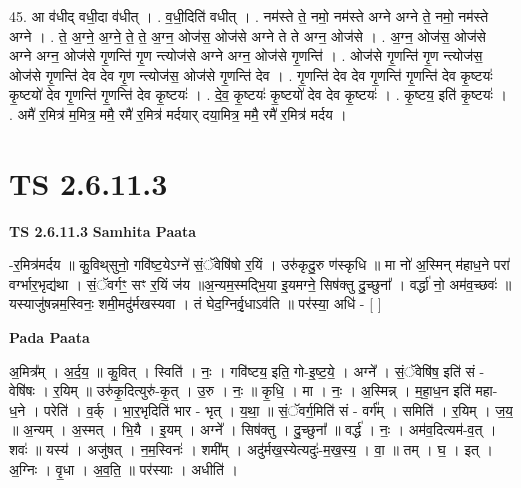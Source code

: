 \documentclass[17pt]{extarticle}
\begin{document}
45. आ व॑धीद् वधी॒दा व॑धीत् । . व॒धी॒दिति॑ वधीत् । . नम॑स्ते ते॒ नमो॒ नम॑स्ते अग्ने अग्ने ते॒ नमो॒ नम॑स्ते अग्ने । . ते॒ अ॒ग्ने॒ अ॒ग्ने॒ ते॒ ते॒ अ॒ग्न॒ ओज॑स॒ ओज॑से अग्ने ते ते अग्न॒ ओज॑से । . अ॒ग्न॒ ओज॑स॒ ओज॑से अग्ने अग्न॒ ओज॑से गृ॒णन्ति॑ गृ॒ण न्त्योज॑से अग्ने अग्न॒ ओज॑से गृ॒णन्ति॑ । . ओज॑से गृ॒णन्ति॑ गृ॒ण न्त्योज॑स॒ ओज॑से गृ॒णन्ति॑ देव देव गृ॒ण न्त्योज॑स॒ ओज॑से गृ॒णन्ति॑ देव । . गृ॒णन्ति॑ देव देव गृ॒णन्ति॑ गृ॒णन्ति॑ देव कृ॒ष्टयः॑ कृ॒ष्टयो॑ देव गृ॒णन्ति॑ गृ॒णन्ति॑ देव कृ॒ष्टयः॑ । . दे॒व॒ कृ॒ष्टयः॑ कृ॒ष्टयो॑ देव देव कृ॒ष्टयः॑ । . कृ॒ष्टय॒ इति॑ कृ॒ष्टयः॑ । . अमै॑ र॒मित्र॑ म॒मित्र॒ ममै॒ रमै॑ र॒मित्र॑ मर्दयार् दया॒मित्र॒ ममै॒ रमै॑ र॒मित्र॑ मर्दय । \newline
\pagebreak
{}
\section*{ TS 2.6.11.3 }

\textbf{TS 2.6.11.3 } \newline
\textbf{Samhita Paata} \newline

-र॒मित्र॑मर्दय ॥ कु॒विथ्‌सुनो॒ गवि॑ष्ट॒येऽग्ने॑ सं॒ॅवेषि॑षो र॒यिं । उरु॑कृदु॒रु ण॑स्कृधि ॥ मा नो॑ अ॒स्मिन् म॑हाध॒ने परा॑ वर्ग्भार॒भृद्य॑था । सं॒ॅवर्गꣳ॒॒ सꣳ र॒यिं ज॑य ॥अ॒न्यम॒स्मद्भि॒या इ॒यमग्ने॒ सिष॑क्तु दु॒च्छुना᳚ । वर्द्धा॑ नो॒ अम॑व॒च्छवः॑ ॥ यस्याजु॑षन्नम॒स्विनः॒ शमी॒मदु॑र्मखस्यवा । तं घेद॒ग्निर्वृ॒धाऽव॑ति ॥ पर॑स्या॒ अधि॑ - [  ] \newline

\textbf{Pada Paata} \newline

अ॒मित्र᳚म् । अ॒र्द॒य॒ ॥ कु॒वित् । स्विति॑ । नः॒ । गवि॑ष्टय॒ इति॒ गो-इ॒ष्ट॒ये॒ । अग्ने᳚ । सं॒ॅवेषि॑ष॒ इति॑ सं - वेषि॑षः । र॒यिम् ॥ उरु॑कृ॒दित्युरु॑-कृ॒त् । उ॒रु । नः॒ ॥ कृ॒धि॒ । मा । नः॒ । अ॒स्मिन्न् । म॒हा॒ध॒न इति॑ महा-ध॒ने । परेति॑ । व॒र्क् । भा॒र॒भृदिति॑ भार - भृत् । य॒था॒ ॥ सं॒ॅवर्ग॒मिति॑ सं - वर्ग᳚म् । समिति॑ । र॒यिम् । ज॒य॒ ॥ अ॒न्यम् । अ॒स्मत् । भि॒यै । इ॒यम् । अग्ने᳚ । सिष॑क्तु । दु॒च्छुना᳚ ॥ वर्द्ध॑ । नः॒ । अम॑व॒दित्यम॑-व॒त् । शवः॑ ॥ यस्य॑ । अजु॑षत् । न॒म॒स्विनः॑ । शमी᳚म् । अदु॑र्मख॒स्येत्यदुः॑-म॒ख॒स्य॒ । वा॒ ॥ तम् । घ॒ । इत् । अ॒ग्निः । वृ॒धा । अ॒व॒ति॒ ॥ पर॑स्याः । अधीति॑ ।  \newline
\end{document}
